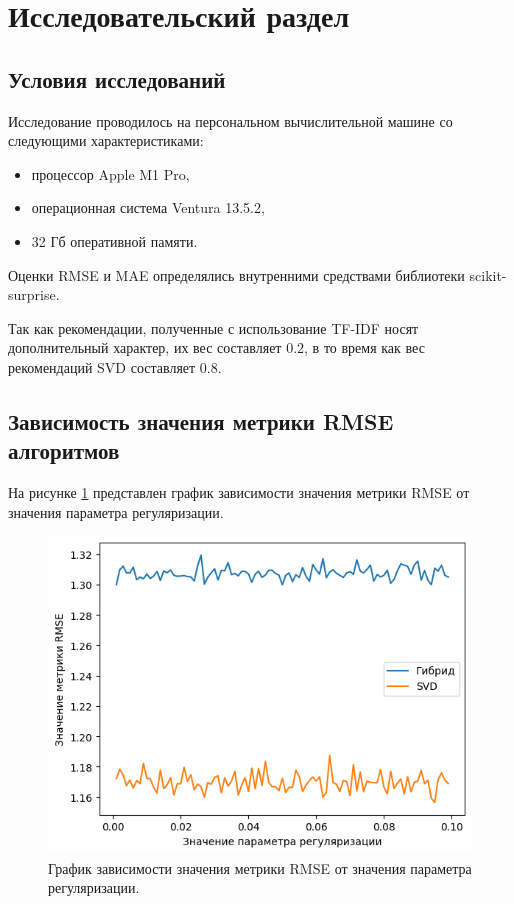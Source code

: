 \section{Исследовательский раздел}
\subsection{Условия исследований}
Исследование проводилось на персональном вычислительной машине со следующими характеристиками:

\begin{itemize}
\item процессор Apple M1 Pro,
\item операционная система Ventura 13.5.2,
\item 32 Гб оперативной памяти.
\end{itemize}

Оценки RMSE и MAE определялись внутренними средствами библиотеки scikit-surprise.

Так как рекомендации, полученные с использование TF-IDF носят дополнительный характер, их вес составляет $0.2$, в то время как вес рекомендаций SVD составляет $0.8$.

\subsection{Зависимость значения метрики RMSE алгоритмов}

На рисунке \ref{img:1} представлен график зависимости значения метрики RMSE от значения параметра регуляризации.

\begin{figure}[H]
	\centering
	\includegraphics[width=\textwidth]{inc/1.png}
	\caption{ График зависимости значения метрики RMSE от значения параметра регуляризации.}
	\label{img:1}
\end{figure}

